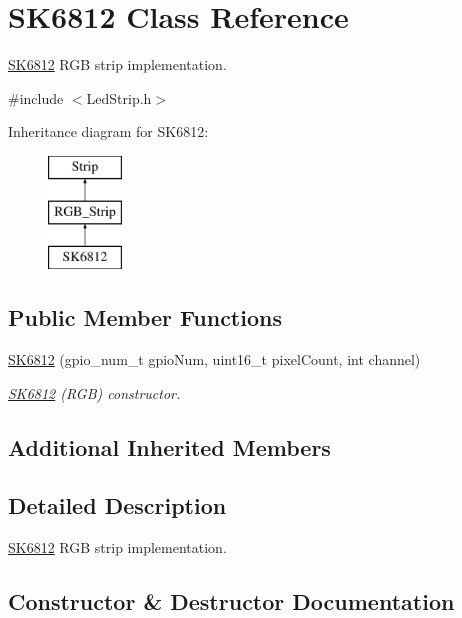 \hypertarget{classSK6812}{}\section{S\+K6812 Class Reference}
\label{classSK6812}


\mbox{\hyperlink{classSK6812}{S\+K6812}} R\+GB strip implementation.  




{\ttfamily \#include $<$Led\+Strip.\+h$>$}

Inheritance diagram for S\+K6812\+:\begin{figure}[H]
\begin{center}
\leavevmode
\includegraphics[height=3.000000cm]{classSK6812}
\end{center}
\end{figure}
\subsection*{Public Member Functions}
\begin{DoxyCompactItemize}
\item 
\mbox{\hyperlink{classSK6812_a083c31c1e7ae9b7cd4de956258aa1f24}{S\+K6812}} (gpio\+\_\+num\+\_\+t gpio\+Num, uint16\+\_\+t pixel\+Count, int channel)
\begin{DoxyCompactList}\small\item\em \mbox{\hyperlink{classSK6812}{S\+K6812}} (R\+GB) constructor. \end{DoxyCompactList}\end{DoxyCompactItemize}
\subsection*{Additional Inherited Members}


\subsection{Detailed Description}
\mbox{\hyperlink{classSK6812}{S\+K6812}} R\+GB strip implementation. 

\subsection{Constructor \& Destructor Documentation}
\mbox{\label{classSK6812_a083c31c1e7ae9b7cd4de956258aa1f24}} 
